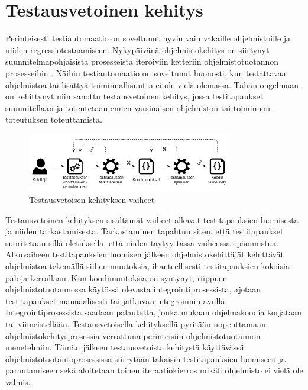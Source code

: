 \section{Testausvetoinen kehitys} \label{ch:07_testausvetoinen_kehitys}

  Perinteisesti testiautomaatio on soveltunut hyvin vain vakaille ohjelmistoille ja niiden regressiotestaamiseen.
  Nykypäivänä ohjelmistokehitys on siirtynyt suunnitelmapohjaisista prosesseista iteroiviin ketteriin ohjelmistotuotannon prosesseihin \parencite{waterfall_to_agile}.
  Näihin testiautomaatio on soveltunut huonosti, kun testattavaa ohjelmistoa tai lisättyä toiminnallisuutta ei ole vielä olemassa.
  Tähän ongelmaan on kehittynyt niin sanottu testausvetoinen kehitys, jossa testitapaukset suunnitellaan ja toteutetaan ennen varsinaisen ohjelmiston tai toiminnon toteutuksen toteuttamista.

  \begin{figure}[H]
    \centering
    \includegraphics[width=0.8\textwidth]{assets/testausvetoinen-kehitys.png}
    \caption{Testausvetoisen kehityksen vaiheet}
    \label{fig:testausvetoinen-kehitys}
  \end{figure}

  Testausvetoinen kehityksen sisältämät vaiheet alkavat testitapauksien luomisesta ja niiden tarkastamisesta.
  Tarkastaminen tapahtuu siten, että testitapaukset suoritetaan sillä oletuksella, että niiden täytyy tässä vaiheessa epäonnistua.
  Alkuvaiheen testitapauksien luomisen jälkeen ohjelmistokehittäjät kehittävät ohjelmistoa tekemällä siihen muutoksia, ihanteellisesti testitapauksien kokoisia paloja kerrallaan.
  Kun koodimuutoksia on syntynyt, riippuen ohjelmistotuotannossa käytössä olevasta integrointiprosessista, ajetaan testitapaukset manuaalisesti tai jatkuvan integroinnin avulla.
  Integrointiprosessista saadaan palautetta, jonka mukaan ohjelmakoodia korjataan tai viimeistellään.
  Testausvetoisella kehityksellä pyritään nopeuttamaan ohjelmistokehitysprosessia verrattuna perinteisiin ohjelmistotuotannon menetelmiin.
  Tämän jälkeen testausvetoista kehitystä käyttävässä ohjelmistotuotantoprosessissa siirrytään takaisin testitapauksien luomiseen ja parantamiseen sekä aloitetaan toinen iteraatiokierros mikäli ohjelmisto ei vielä ole valmis.


